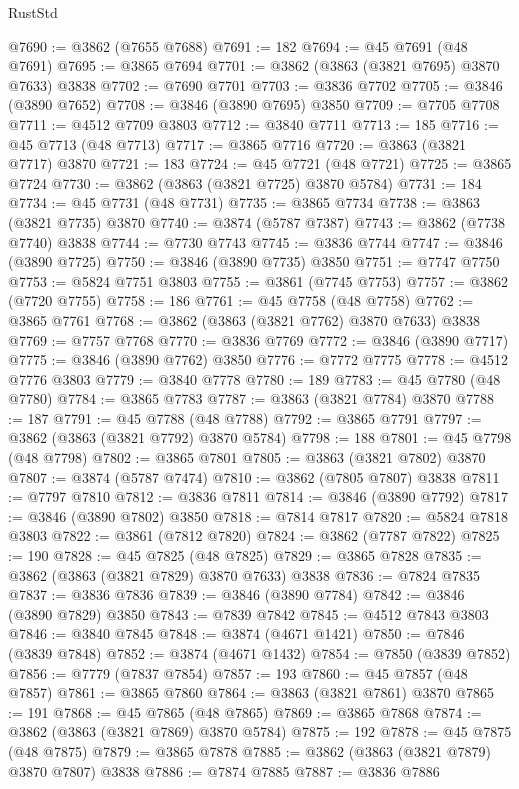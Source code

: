 \begin{lexlean}{RustStd}
\begin{coremodule}
@7690 := @3862 (@7655 @7688)
@7691 := 182
@7694 := @45 @7691 (@48 @7691)
@7695 := @3865 @7694
@7701 := @3862 (@3863 (@3821 @7695) @3870 @7633) @3838
@7702 := @7690 @7701
@7703 := @3836 @7702
@7705 := @3846 (@3890 @7652)
@7708 := @3846 (@3890 @7695) @3850
@7709 := @7705 @7708
@7711 := @4512 @7709 @3803
@7712 := @3840 @7711
@7713 := 185
@7716 := @45 @7713 (@48 @7713)
@7717 := @3865 @7716
@7720 := @3863 (@3821 @7717) @3870
@7721 := 183
@7724 := @45 @7721 (@48 @7721)
@7725 := @3865 @7724
@7730 := @3862 (@3863 (@3821 @7725) @3870 @5784)
@7731 := 184
@7734 := @45 @7731 (@48 @7731)
@7735 := @3865 @7734
@7738 := @3863 (@3821 @7735) @3870
@7740 := @3874 (@5787 @7387)
@7743 := @3862 (@7738 @7740) @3838
@7744 := @7730 @7743
@7745 := @3836 @7744
@7747 := @3846 (@3890 @7725)
@7750 := @3846 (@3890 @7735) @3850
@7751 := @7747 @7750
@7753 := @5824 @7751 @3803
@7755 := @3861 (@7745 @7753)
@7757 := @3862 (@7720 @7755)
@7758 := 186
@7761 := @45 @7758 (@48 @7758)
@7762 := @3865 @7761
@7768 := @3862 (@3863 (@3821 @7762) @3870 @7633) @3838
@7769 := @7757 @7768
@7770 := @3836 @7769
@7772 := @3846 (@3890 @7717)
@7775 := @3846 (@3890 @7762) @3850
@7776 := @7772 @7775
@7778 := @4512 @7776 @3803
@7779 := @3840 @7778
@7780 := 189
@7783 := @45 @7780 (@48 @7780)
@7784 := @3865 @7783
@7787 := @3863 (@3821 @7784) @3870
@7788 := 187
@7791 := @45 @7788 (@48 @7788)
@7792 := @3865 @7791
@7797 := @3862 (@3863 (@3821 @7792) @3870 @5784)
@7798 := 188
@7801 := @45 @7798 (@48 @7798)
@7802 := @3865 @7801
@7805 := @3863 (@3821 @7802) @3870
@7807 := @3874 (@5787 @7474)
@7810 := @3862 (@7805 @7807) @3838
@7811 := @7797 @7810
@7812 := @3836 @7811
@7814 := @3846 (@3890 @7792)
@7817 := @3846 (@3890 @7802) @3850
@7818 := @7814 @7817
@7820 := @5824 @7818 @3803
@7822 := @3861 (@7812 @7820)
@7824 := @3862 (@7787 @7822)
@7825 := 190
@7828 := @45 @7825 (@48 @7825)
@7829 := @3865 @7828
@7835 := @3862 (@3863 (@3821 @7829) @3870 @7633) @3838
@7836 := @7824 @7835
@7837 := @3836 @7836
@7839 := @3846 (@3890 @7784)
@7842 := @3846 (@3890 @7829) @3850
@7843 := @7839 @7842
@7845 := @4512 @7843 @3803
@7846 := @3840 @7845
@7848 := @3874 (@4671 @1421)
@7850 := @7846 (@3839 @7848)
@7852 := @3874 (@4671 @1432)
@7854 := @7850 (@3839 @7852)
@7856 := @7779 (@7837 @7854)
@7857 := 193
@7860 := @45 @7857 (@48 @7857)
@7861 := @3865 @7860
@7864 := @3863 (@3821 @7861) @3870
@7865 := 191
@7868 := @45 @7865 (@48 @7865)
@7869 := @3865 @7868
@7874 := @3862 (@3863 (@3821 @7869) @3870 @5784)
@7875 := 192
@7878 := @45 @7875 (@48 @7875)
@7879 := @3865 @7878
@7885 := @3862 (@3863 (@3821 @7879) @3870 @7807) @3838
@7886 := @7874 @7885
@7887 := @3836 @7886

\end{coremodule}
\end{lexlean}
